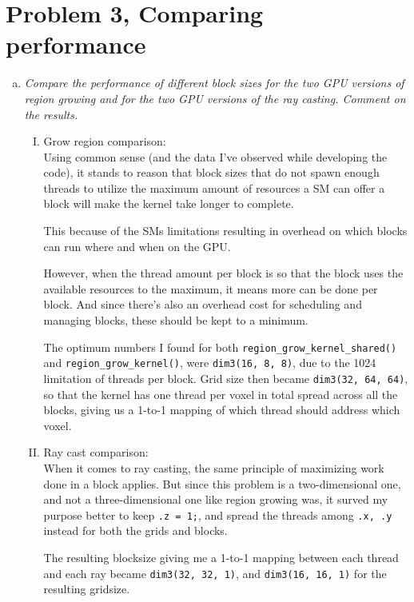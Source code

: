 \documentclass[fontsize=11pt, paper=a4, titlepage]{article}
\begin{document}
\section*{Problem 3, Comparing performance}
\begin{enumerate}[a)]

    \item \textit{Compare the performance of different block sizes for the two
GPU versions of region growing and for the two GPU versions of the ray
casting. Comment on the results.}

    \begin{enumerate}[I)]
        \item Grow region comparison:\\
        Using common sense (and the data I've observed while developing the
code), it stands to reason that block sizes that do not spawn enough threads to
utilize the maximum amount of resources a SM can offer a block will make the
kernel take longer to complete.

This because of the SMs limitations resulting in overhead on which blocks can
run where and when on the GPU.

However, when the thread amount per block is so that the block uses the
available resources to the maximum, it means more can be done per block. And
since there's also an overhead cost for scheduling and managing blocks, these
should be kept to a minimum.

The optimum numbers I found for both \verb#region_grow_kernel_shared()# and
\verb#region_grow_kernel()#, were \verb#dim3(16, 8, 8)#, due to the 1024
limitation of threads per block. Grid size then became \verb#dim3(32, 64, 64)#,
so that the kernel has one thread per voxel in total spread across all the
blocks, giving us a 1-to-1 mapping of which thread should address which voxel.

        \item Ray cast comparison:\\
        When it comes to ray casting, the same principle of maximizing work done
in a block applies. But since this problem is a two-dimensional one, and not a
three-dimensional one like region growing was, it surved my purpose better to
keep \verb#.z = 1;#, and spread the threads among \verb#.x, .y# instead for both
the grids and blocks.

The resulting blocksize giving me a 1-to-1 mapping between each thread and each
ray became \verb#dim3(32, 32, 1)#, and \verb#dim3(16, 16, 1)# for the resulting
gridsize.


\end{enumerate}
\end{enumerate}
\end{document}
